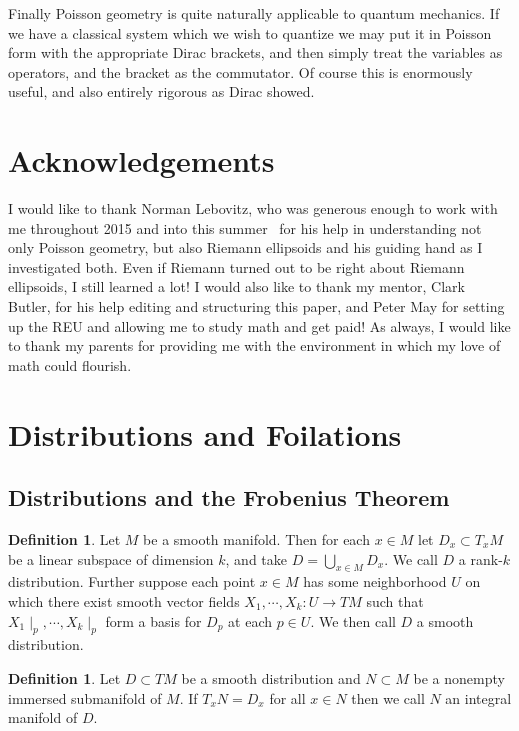 \documentclass[psamsfonts,12pt]{amsart}
\newcommand\0{\mathbf{0}}
\theoremstyle{plain}
\theoremstyle{definition}
\newtheorem{dfn}[thm]{Definition} %
\begin{document}
Finally Poisson geometry is quite naturally applicable to quantum mechanics.  If we have a classical system which we wish to quantize we may put it in Poisson form with the appropriate Dirac brackets, and then simply treat the variables as operators, and the bracket as the commutator.  Of course this is enormously useful, and also entirely rigorous as Dirac showed.



\section{Acknowledgements}
I would like to thank Norman Lebovitz, who was generous enough to work with me throughout 2015 and into this summer \textemdash \ for his help in understanding not only Poisson geometry, but also Riemann ellipsoids and his guiding hand as I investigated both.  Even if Riemann turned out to be right about Riemann ellipsoids, I still learned a lot!  I would also like to thank my mentor, Clark Butler, for his help editing and structuring this paper, and Peter May for setting up the REU and allowing me to study math and get paid!  As always, I would like to thank my parents for providing me with the environment in which my love of math could flourish.


\appendix
\section{Distributions and Foilations}

\subsection{Distributions and the Frobenius Theorem}
\begin{dfn}
Let $M$ be a smooth manifold.  Then for each $x\in M$ let $D_x\subset T_xM$ be a linear subspace of dimension $k$, and take $D=\bigcup_{x\in M}D_x$.  We call $D$ a rank-$k$ distribution.  Further suppose each point $x\in M$ has some neighborhood $U$ on which there exist smooth vector fields $X_1,\cdots, X_k\colon U \rightarrow TM$ such that $X_1\mid_p, \cdots, X_k \mid_p$ form a basis for $D_p$ at each $p\in U$.  We then call $D$ a smooth distribution.
\end{dfn}

\begin{dfn}
Let $D\subset TM$ be a smooth distribution and $N\subset M$ be a nonempty immersed submanifold of $M$.  If $T_x N=D_x$ for all $x\in N$ then we call $N$ an integral manifold of $D$.
\end{dfn}
\end{document}
